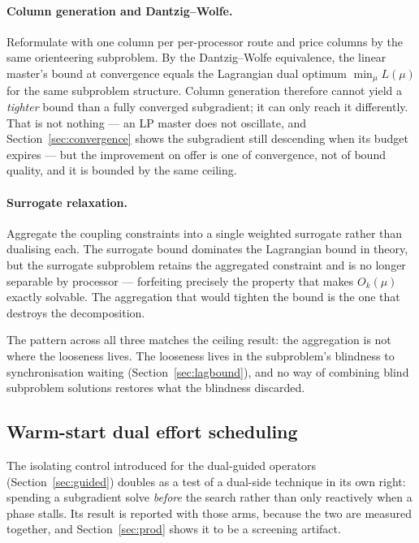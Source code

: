 \documentclass[11pt,a4paper]{article}
\begin{document}
\paragraph{Column generation and Dantzig--Wolfe.} Reformulate with one column per
per-processor route and price columns by the same orienteering subproblem. By the
Dantzig--Wolfe equivalence, the linear master's bound at convergence equals the
Lagrangian dual optimum $\min_\mu L(\mu)$ for the same subproblem structure. Column
generation therefore cannot yield a \emph{tighter} bound than a fully converged
subgradient; it can only reach it differently. That is not nothing --- an LP master
does not oscillate, and Section~\ref{sec:convergence} shows the subgradient still
descending when its budget expires --- but the improvement on offer is one of
convergence, not of bound quality, and it is bounded by the same ceiling.

\paragraph{Surrogate relaxation.} Aggregate the coupling constraints into a single
weighted surrogate rather than dualising each. The surrogate bound dominates the
Lagrangian bound in theory, but the surrogate subproblem retains the aggregated
constraint and is no longer separable by processor --- forfeiting precisely the
property that makes $O_k(\mu)$ exactly solvable. The aggregation that would
tighten the bound is the one that destroys the decomposition.

The pattern across all three matches the ceiling result: the aggregation is not
where the looseness lives. The looseness lives in the subproblem's blindness to
synchronisation waiting (Section~\ref{sec:lagbound}), and no way of combining
blind subproblem solutions restores what the blindness discarded.

\subsection{Warm-start dual effort scheduling}\label{sec:warm}

The isolating control introduced for the dual-guided operators
(Section~\ref{sec:guided}) doubles as a test of a dual-side technique in its own
right: spending a subgradient solve \emph{before} the search rather than only
reactively when a phase stalls. Its result is reported with those arms, because
the two are measured together, and Section~\ref{sec:prod} shows it to be a
screening artifact.
\end{document}
